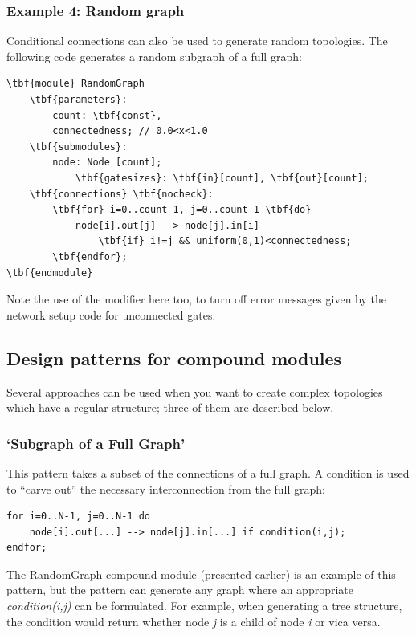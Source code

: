 \subsubsection{Example 4: Random graph}

Conditional connections can also be used to generate random
topologies.  The following code generates a
random subgraph of a full graph:

\begin{Verbatim}[commandchars=\\\{\}]
\tbf{module} RandomGraph
    \tbf{parameters}:
        count: \tbf{const},
        connectedness; // 0.0<x<1.0
    \tbf{submodules}:
        node: Node [count];
            \tbf{gatesizes}: \tbf{in}[count], \tbf{out}[count];
    \tbf{connections} \tbf{nocheck}:
        \tbf{for} i=0..count-1, j=0..count-1 \tbf{do}
            node[i].out[j] --> node[j].in[i]
                \tbf{if} i!=j && uniform(0,1)<connectedness;
        \tbf{endfor};
\tbf{endmodule}
\end{Verbatim}

Note the use of the  modifier
here too, to turn off error messages given by the network setup code
for unconnected gates.


\subsection{Design patterns for compound modules}


Several approaches can be used when you want to create complex
topologies which have a regular structure; three of them are
described below.


\subsubsection{`Subgraph of a Full Graph'}


This pattern takes a subset of the connections of a full graph.  A
condition is used to ``carve out'' the necessary interconnection from
the full graph:

\begin{Verbatim}[commandchars=\\\{\}]
for i=0..N-1, j=0..N-1 do
    node[i].out[...] --> node[j].in[...] if condition(i,j);
endfor;
\end{Verbatim}

The RandomGraph compound module (presented earlier) is an example of
this pattern, but the pattern can generate any graph where an
appropriate \textit{condition(i,j)} can be formulated. For example,
when generating a tree structure, the condition
would return whether node \textit{j} is a child of node \textit{i} or
vica versa.

